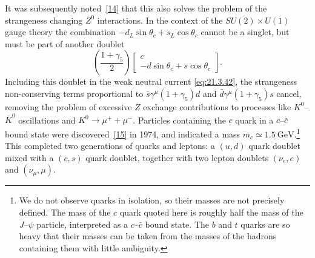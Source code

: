 It was subsequently noted~\hyperref[ch21-ref-14]{[14]} that this also solves the problem of the strangeness changing $Z^0$ interactions. In the context of the $SU(2)\times U(1)$ gauge theory the combination $-d_L\sin\theta_c+s_L\cos\theta_c$ cannot be a singlet, but must be part of another doublet
\begin{equation}
\left(\frac{1+\gamma_5}{2}\right)
\begin{bmatrix}
c\\
-d\sin\theta_c+s\cos\theta_c
\end{bmatrix}.
\tag{21.3.44}\label{eq:21.3.44}
\end{equation}
Including this doublet in the weak neutral current \eqref{eq:21.3.42}, the strangeness non-conserving terms proportional to $\bar s\gamma^\mu(1+\gamma_5)d$ and $\bar d\gamma^\mu(1+\gamma_5)s$ cancel, removing the problem of excessive $Z$ exchange contributions to processes like $K^0$--$\bar K^0$ oscillations and $K^0\to\mu^++\mu^-$. Particles containing the $c$ quark in a $c$--$\bar c$ bound state were discovered~\hyperref[ch21-ref-15]{[15]} in 1974, and indicated a mass $m_c\simeq1.5\ \mathrm{GeV}$.\footnote{We do not observe quarks in isolation, so their masses are not precisely defined. The mass of the $c$ quark quoted here is roughly half the mass of the $J$--$\psi$ particle, interpreted as a $c$--$\bar c$ bound state. The $b$ and $t$ quarks are so heavy that their masses can be taken from the masses of the hadrons containing them with little ambiguity.} This completed two generations of quarks and leptons: a $(u,d)$ quark doublet mixed with a $(c,s)$ quark doublet, together with two lepton doublets $(\nu_e,e)$ and $(\nu_\mu,\mu)$.

